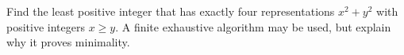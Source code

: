 Find the least positive integer that has exactly four representations $x^2+y^2$ with positive integers $x\ge y$. A finite exhaustive algorithm may be used, but explain why it proves minimality.
